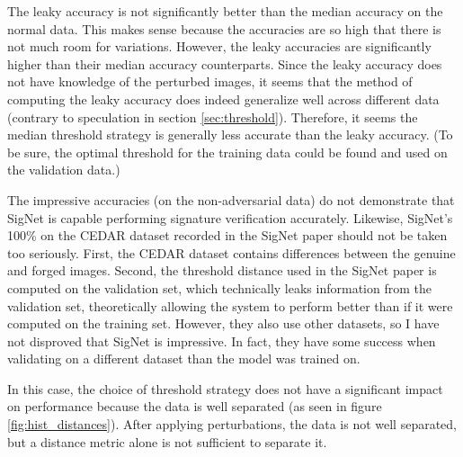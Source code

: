 The leaky accuracy is not significantly better than the median accuracy on the normal data.
This makes sense because the accuracies are so high that there is not much room for variations.
However, the leaky accuracies are significantly higher than their median accuracy counterparts.
Since the leaky accuracy does not have knowledge of the perturbed images, it seems that the method of computing the leaky accuracy does indeed generalize well across different data (contrary to speculation in section \ref{sec:threshold}).
Therefore, it seems the median threshold strategy is generally less accurate than the leaky accuracy.
(To be sure, the optimal threshold for the training data could be found and used on the validation data.)

The impressive accuracies (on the non-adversarial data) do not demonstrate that SigNet is capable performing signature verification accurately.
Likewise, SigNet's 100\% on the CEDAR dataset recorded in the SigNet paper should not be taken too seriously.
First, the CEDAR dataset contains differences between the genuine and forged images.
Second, the threshold distance used in the SigNet paper is computed on the validation set, which technically leaks information from the validation set, theoretically allowing the system to perform better than if it were computed on the training set.
However, they also use other datasets, so I have not disproved that SigNet is impressive.
In fact, they have some success when validating on a different dataset than the model was trained on\cite{sig_net}.

In this case, the choice of threshold strategy does not have a significant impact on performance because the data is well separated (as seen in figure \ref{fig:hist_distances}).
After applying perturbations, the data is not well separated, but a distance metric alone is not sufficient to separate it.


